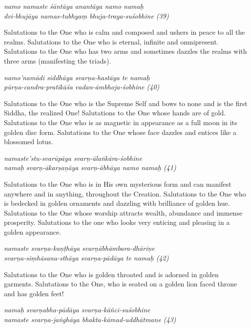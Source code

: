 \documentclass[11pt,oneside,a4paper]{article}
\newenvironment{shloka}[1]
  {\bigskip\center#1\varwidth{\linewidth}}
  {\endvarwidth\endcenter\bigskip}
\begin{document}
\begin{shloka}\itshape
  namo namaste śāntāya anantāya namo namaḥ\\
  dvi-bhujāya namas-tubhyaṃ bhuja-traya-suśobhine (39)
\end{shloka}

Salutations to the One who is calm and composed and ushers in peace to all
the realms. Salutations to the One who is eternal, infinite and omnipresent.
Salutations to the One who has two arms and sometimes dazzles the realms with
three arms (manifesting the triads).

\begin{shloka}\itshape
  namo'namādi siddhāya svarṇa-hastāya te namaḥ\\
  pūrṇa-candra-pratīkāśa vadan-āmbhoja-śobhine (40)
\end{shloka}

Salutations to the One who is the Supreme Self and bows to none and is the first
Siddha, the realized One! Salutations to the One whose hands are of gold.
Salutations to the One who is as magnetic in appearance as a full moon in its
golden disc form. Salutations to the One whose face dazzles and entices like
a blossomed lotus.

\begin{shloka}\itshape
  namaste'stu-svarūpāya svarṇ-ālaṅkāra-śobhine\\
  namaḥ svarṇ-ākarṣaṇāya svarṇ-ābhāya namo namaḥ (41)
\end{shloka}

Salutations to the One who is in His own mysterious form and can manifest
anywhere and in anything, throughout the Creation. Salutations to the One who is
bedecked in golden ornaments and dazzling with brilliance of golden hue.
Salutations to the One whose worship attracts wealth, abundance and immense
prosperity. Salutations to the one who looks very enticing and pleasing in
a golden appearance.

\begin{shloka}\itshape
  namaste svarṇa-kaṇṭhāya svarṇābhāmbara-dhāriṇe\\
  svarṇa-siṃhāsana-sthāya svarṇa-pādāya te namaḥ (42)
\end{shloka}

Salutations to the One who is golden throated and is adorned in golden garments.
Salutations to the One, who is seated on a golden lion faced throne and has
golden feet!

\begin{shloka}\itshape
  namaḥ svarṇabha-pādāya svarṇa-kāñcī-suśobhine\\
  namaste svarṇa-jaṅghāya bhakta-kāmad-uddhātmane (43)
\end{shloka}
\end{document}
